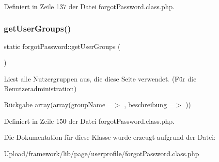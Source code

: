Definiert in Zeile 137 der Datei forgot\+Password.\+class.\+php.

\mbox{\label{classforgot_password_a37c99be6731e040c6059b827d5831497}} 
\subsubsection{\texorpdfstring{get\+User\+Groups()}{getUserGroups()}}
{\footnotesize\ttfamily static forgot\+Password\+::get\+User\+Groups (\begin{DoxyParamCaption}{ }\end{DoxyParamCaption})\hspace{0.3cm}{\ttfamily [static]}}

Liest alle Nutzergruppen aus, die diese Seite verwendet. (Für die Benutzeradministration) \begin{DoxyReturn}{Rückgabe}
array(array(\textquotesingle{}group\+Name\textquotesingle{} =$>$ \textquotesingle{}\textquotesingle{}, \textquotesingle{}beschreibung\textquotesingle{} =$>$ \textquotesingle{}\textquotesingle{})) 
\end{DoxyReturn}


Definiert in Zeile 150 der Datei forgot\+Password.\+class.\+php.



Die Dokumentation für diese Klasse wurde erzeugt aufgrund der Datei\+:\begin{DoxyCompactItemize}
\item 
Upload/framework/lib/page/userprofile/forgot\+Password.\+class.\+php\end{DoxyCompactItemize}

